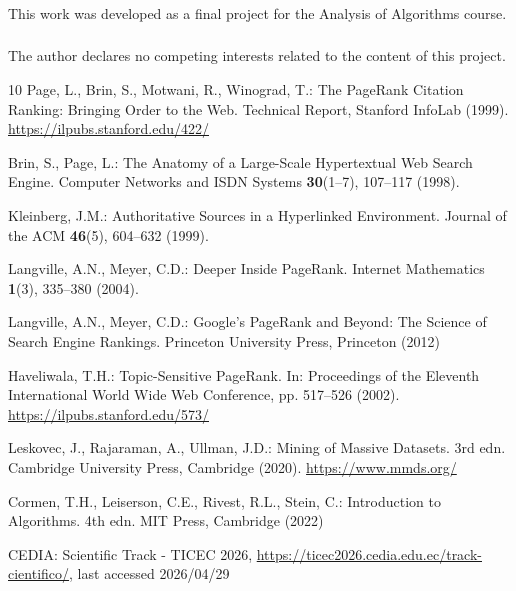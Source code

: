 \documentclass[runningheads]{llncs}
\begin{document}
\begin{credits}
\subsubsection{\ackname} This work was developed as a final project for the Analysis of Algorithms course.

\subsubsection{\discintname}
The author declares no competing interests related to the content of this project.
\end{credits}
%
%
%
% 
% 
%
\begin{thebibliography}{10}
Page, L., Brin, S., Motwani, R., Winograd, T.: The PageRank Citation Ranking: Bringing Order to the Web. Technical Report, Stanford InfoLab (1999). \url{https://ilpubs.stanford.edu/422/}

Brin, S., Page, L.: The Anatomy of a Large-Scale Hypertextual Web Search Engine. Computer Networks and ISDN Systems \textbf{30}(1--7), 107--117 (1998). 

Kleinberg, J.M.: Authoritative Sources in a Hyperlinked Environment. Journal of the ACM \textbf{46}(5), 604--632 (1999). 

Langville, A.N., Meyer, C.D.: Deeper Inside PageRank. Internet Mathematics \textbf{1}(3), 335--380 (2004). 

Langville, A.N., Meyer, C.D.: Google's PageRank and Beyond: The Science of Search Engine Rankings. Princeton University Press, Princeton (2012)

Haveliwala, T.H.: Topic-Sensitive PageRank. In: Proceedings of the Eleventh International World Wide Web Conference, pp. 517--526 (2002). \url{https://ilpubs.stanford.edu/573/}

Leskovec, J., Rajaraman, A., Ullman, J.D.: Mining of Massive Datasets. 3rd edn. Cambridge University Press, Cambridge (2020). \url{https://www.mmds.org/}

Cormen, T.H., Leiserson, C.E., Rivest, R.L., Stein, C.: Introduction to Algorithms. 4th edn. MIT Press, Cambridge (2022)

CEDIA: Scientific Track - TICEC 2026, \url{https://ticec2026.cedia.edu.ec/track-cientifico/}, last accessed 2026/04/29
\end{thebibliography}
\end{document}
